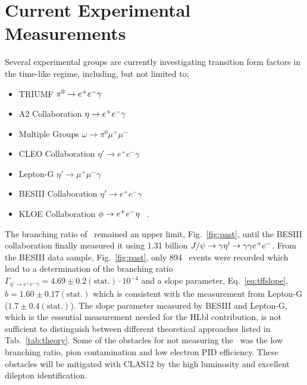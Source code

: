 \section{Current Experimental Measurements}\label{sec:current}
Several experimental groups are currently investigating transition form factors in the time-like regime, including, but not limited to;
\begin{itemize}
	\item TRIUMF $\pi^0 \to e^+e^- \gamma$~\cite{FARZ} 
	\item A2 Collaboration $\eta \to e^+e^- \gamma$~\cite{Berg,A2} 
	\item Multiple Groups $\omega\to\pi^0 \mu^+\mu^-$ ~\cite{Dzhelyadin:1980tj,Arnaldi:2009aa,Uras:2011zz}
	\item CLEO Collaboration $\eta'\to e^+e^-\gamma $~\cite{CLEO}
	\item Lepton-G $\eta'\to \mu^+\mu^-\gamma $~\cite{DZH}
	\item BESIII Collaboration $\eta'\to e^+e^-\gamma $~\cite{Ablikim:2015wnx}
	\item KLOE Collaboration $\phi \rightarrow e^+e^- \eta$~\cite{Babusci:2014ldz} .
\end{itemize}
The branching ratio of \etaPDal \ remained an upper limit, Fig.~\ref{fig:past}, until the BESIII collaboration finally measured it using 1.31 billion $J/\psi \to \gamma \eta^{\prime} \to \gamma \gamma e^+e^-$. From the BESIII data sample, Fig.~\ref{fig:past}, only 894 \etaPDal \ events were recorded which lead to a determination of the branching ratio $\Gamma_{\eta^{\prime} \rightarrow e^+e^- \gamma}  = 4.69 \pm 0.2 (\mathrm{stat.})\cdot 10^{-4}$ and a slope parameter, Eq.~\ref{eq:tffslope}, $b = 1.60\pm0.17(\mathrm{stat.})$ which is consistent with the measurement from Lepton-G ($1.7 \pm 0.4 (\mathrm{stat.})$). The slope parameter measured by BESIII and Lepton-G, which is the essential measurement needed for the HLbl contribution, is not sufficient to distinguish between different theoretical approaches listed in Tab.~\ref{tab:theory}. Some of the obstacles for not measuring the \etaPDal \ was the low branching ratio, pion contamination and low electron PID efficiency. These obstacles will be mitigated with CLAS12 by the high luminosity and excellent dilepton identification.

